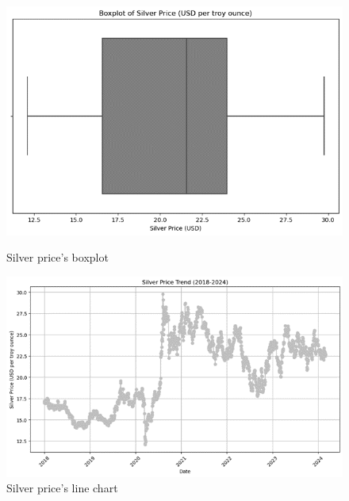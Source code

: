 \documentclass{ieeeojies}
\begin{document}
\begin{figure}[H]
    \centering
    \begin{minipage}{0.23\textwidth}
    \centering
    \includegraphics[width=1\textwidth]{bibliography/Figure/boxplot_silver.png}
    \caption{Silver price's boxplot}
    \label{fig:1}
    \end{minipage}
    \hfill
    \begin{minipage}{0.23\textwidth}
    \centering
    \includegraphics[width=1\textwidth]{bibliography/Figure/line_silver.png}
    \caption{Silver price's line chart}
    \label{fig:2}
    \end{minipage}
\end{figure}
\end{document}
